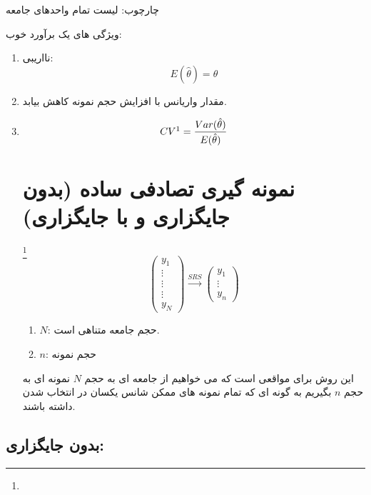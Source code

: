 چارچوب: لیست تمام واحدهای جامعه

ویژگی های یک برآورد خوب:
\begin{enumerate}
	\item نااریبی:
	\begin{equation*}
		E(\hat{\theta})=\theta
	\end{equation*}
	\item مقدار واریانس با افزایش حجم نمونه کاهش بیابد.
	\item 
	\begin{equation*}
		CV\footnotemark=\frac{Var(\hat{\theta})}{E(\hat{\theta})}	
	\end{equation*}
	\section*{نمونه گیری تصادفی ساده (بدون جایگزاری و با جایگزاری)}
	\footnote{}
	\begin{equation*}
		\begin{pmatrix}
			y_1 \\
			\vdots \\
			\vdots \\
			\vdots \\
			y_N
		\end{pmatrix}
		\overset{SRS}{\longrightarrow} 
		\begin{pmatrix}
			y_1 \\
			\vdots \\
			y_n
		\end{pmatrix}
	\end{equation*}
	\begin{enumerate}
		\item $N$: حجم جامعه متناهی است.
		\item $n$: حجم نمونه
	\end{enumerate}
	این روش برای مواقعی است که می خواهیم از جامعه ای به حجم
	$N$
	نمونه ای به حجم 
	$n$
	بگیریم به گونه ای که تمام نمونه های ممکن شانس یکسان در انتخاب شدن داشته باشند.
\end{enumerate}
\subsection*{بدون جایگزاری:}
